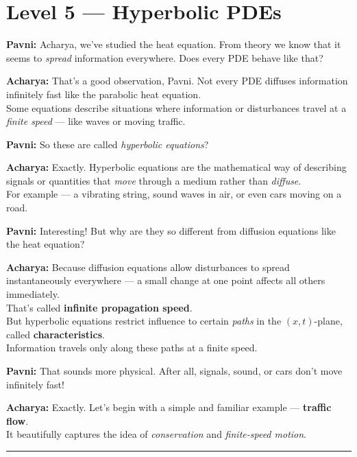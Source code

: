\documentclass[
  letterpaper,
]{book}
\begin{document}

\chapter{Level 5 --- Hyperbolic PDEs}\label{level-5-hyperbolic-pdes}

\textbf{Pavni:} Acharya, we've studied the heat equation. From theory we
know that it seems to \emph{spread} information everywhere. Does every
PDE behave like that?

\textbf{Acharya:} That's a good observation, Pavni. Not every PDE
diffuses information infinitely fast like the parabolic heat equation.\\
Some equations describe situations where information or disturbances
travel at a \emph{finite speed} --- like waves or moving traffic.

\textbf{Pavni:} So these are called \emph{hyperbolic equations}?

\textbf{Acharya:} Exactly. Hyperbolic equations are the mathematical way
of describing signals or quantities that \emph{move} through a medium
rather than \emph{diffuse}.\\
For example --- a vibrating string, sound waves in air, or even cars
moving on a road.

\textbf{Pavni:} Interesting! But why are they so different from
diffusion equations like the heat equation?

\textbf{Acharya:} Because diffusion equations allow disturbances to
spread instantaneously everywhere --- a small change at one point
affects all others immediately.\\
That's called \textbf{infinite propagation speed}.\\
But hyperbolic equations restrict influence to certain \emph{paths} in
the \((x,t)\)-plane, called \textbf{characteristics}.\\
Information travels only along these paths at a finite speed.

\textbf{Pavni:} That sounds more physical. After all, signals, sound, or
cars don't move infinitely fast!

\textbf{Acharya:} Exactly. Let's begin with a simple and familiar
example --- \textbf{traffic flow}.\\
It beautifully captures the idea of \emph{conservation} and
\emph{finite-speed motion}.

\begin{center}\rule{0.5\linewidth}{0.5pt}\end{center}
\end{document}
